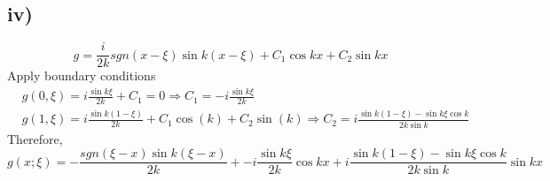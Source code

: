 \documentclass[a4paper, 11pt]{article}
\begin{document}
\begin{spacing}{1.5}
\subsection*{iv)}
$$
g = \frac{i}{2k} sgn(x-\xi) \sin k(x-\xi) + C_1\cos kx + C_2\sin kx
$$
Apply boundary conditions
\begin{align*}
& g(0,\xi) = i\frac{\sin k\xi}{2k} + C_1 = 0  \Rightarrow C_1=-i\frac{\sin k\xi}{2k}\\
& g(1,\xi) = i\frac{\sin k(1-\xi)}{2k} + C_1 \cos(k) + C_2 \sin(k) \Rightarrow C_2 =i \frac{\sin k(1-\xi) - \sin k\xi \cos k}{2k\sin k}
\end{align*}
Therefore,
$$
g(x;\xi) = -\frac{sgn(\xi-x) \sin k(\xi-x)}{2k} + -i\frac{\sin k\xi}{2k} \cos kx +i \frac{\sin k(1-\xi) - \sin k\xi \cos k}{2k\sin k}\sin kx
$$








\end{spacing}
\end{document}
